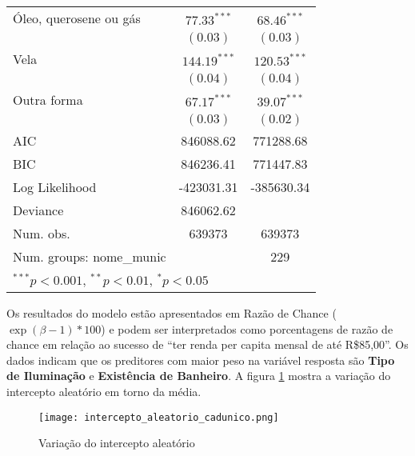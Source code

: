 \documentclass[a4paper, 12pt, openright, oneside, english, brazil, article]{abntex2}
\begin{document}
\begin{table}[!h]
{\begin{tabular}{l c c}
				Óleo, querosene ou gás           & $77.33^{***}$  & $68.46^{***}$  \\
				& $(0.03)$      & $(0.03)$      \\
				Vela                             & $144.19^{***}$  & $120.53^{***}$  \\
				& $(0.04)$      & $(0.04)$      \\
				Outra forma                      & $67.17^{***}$  & $39.07^{***}$  \\
				& $(0.03)$      & $(0.02)$      \\
				\hline
				AIC                                                         & 846088.62     & 771288.68     \\
				BIC                                                         & 846236.41     & 771447.83     \\
				Log Likelihood                                              & -423031.31    & -385630.34    \\
				Deviance                                                    & 846062.62     &               \\
				Num. obs.                                                   & 639373        & 639373        \\
				Num. groups: nome\_munic                                    &               & 229           \\
				
				\hline
				\multicolumn{3}{l}{\scriptsize{$^{***}p<0.001$, $^{**}p<0.01$, $^*p<0.05$}}
			\end{tabular}
		}
		{}
	\end{table}
	
	
	Os resultados do modelo estão apresentados em Razão de Chance ($\exp(\beta - 1) * 100$) e podem ser interpretados como porcentagens de razão de chance em relação ao sucesso de ``ter renda per capita mensal de até R\$85,00''. Os dados indicam que os preditores com maior peso na variável resposta são \textbf{Tipo de Iluminação} e \textbf{Existência de Banheiro}. A figura \ref{intercepto-aleatorio} mostra a variação do intercepto aleatório em torno da média.
	
	\begin{figure}
		\centering
		\caption{Variação do intercepto aleatório}
		\label{intercepto-aleatorio}
		\texttt{[image: intercepto\_aleatorio\_cadunico.png]}
	\end{figure}
	
\newpage


\cleardoublepage{}
\end{document}
